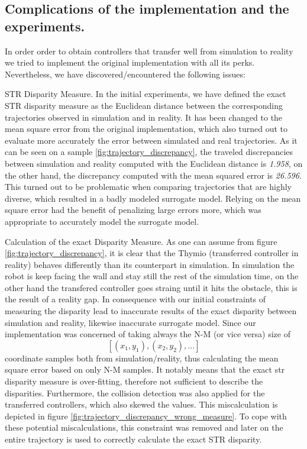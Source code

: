 \subsection{Complications of the implementation and the experiments.} 

In order order to obtain controllers that transfer well from simulation to reality we tried to implement the original implementation with all its perks. Nevertheless, we have discovered/encountered the following issues:

\begin{description}
	
    \item{STR Disparity Measure}. In the initial experiments, we have defined the exact STR disparity measure as the Euclidean distance between the corresponding trajectories observed in simulation and in reality. It has been changed to the mean square error from the original implementation, which also turned out to evaluate more accurately the error between simulated and real trajectories. As it can be seen on a sample \ref{fig:trajectory_discrepancy}, the traveled discrepancies between simulation and reality computed with the Euclidean distance is \textit{1.958}, on the other hand, the discrepancy computed with the mean squared error is \textit{26.596}. This turned out to be problematic when comparing trajectories that are highly diverse, which resulted in a badly modeled surrogate model. Relying on the mean square error had the benefit of penalizing large errors more, which was appropriate to accurately model the surrogate model. 
    
    \item{Calculation of the exact Disparity Measure}. As one can assume from figure \ref{fig:trajectory_discrepancy}, it is clear that the Thymio (transferred controller in reality) behaves differently than its counterpart in simulation. In simulation the robot is keep facing the wall and stay still the rest of the simulation time, on the other hand the transfered controller goes straing until it hits the obstacle, this is the result of a reality gap. In consequence with our initial constraints of measuring the disparity lead to inaccurate results of the exact disparity between simulation and reality, likewise inaccurate surrogate model. Since our implementation was concerned of taking always the N-M (or vice versa) size of \[ [(x_1,y_1), (x_2, y_2), ...] \] coordinate samples both from simulation/reality, thus calculating the mean square error based on only N-M samples. It notably means that the exact str disparity measure is over-fitting, therefore not sufficient to describe the disparities. Furthermore, the collision detection was also applied for the transferred controllers, which also skewed the values. This miscalculation is depicted in figure \ref{fig:trajectory_discrepancy_wrong_measure}. To cope with these potential miscalculations, this constraint was removed and later on the entire trajectory is used to correctly calculate the exact STR disparity.
	
\end{description}

